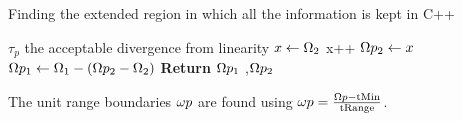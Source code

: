 \begin{algorithm}[H]
 \caption{Finding the extended region in which all the information is kept in C++}
\begin{algorithmic}
 \linebreak \phantom{Require} $\tau_{p}$ the acceptable divergence from linearity 
 \State $x \gets \Omega_2$  
     \State  x++ 
 \EndWhile
 \State $\Omega p_2 \gets x$ 
 \State $\Omega p_1 \gets \Omega _1 - (\Omega p_2 - \Omega _2)$ 
 \State \textbf{Return} {$\Omega p_1$ ,$\Omega p_2$ }
 \end{algorithmic}
\end{algorithm}

The unit range boundaries $\omega p$ are found using  $\omega p =  \frac{\Omega p - \text{tMin}}{\text{tRange}}$.


